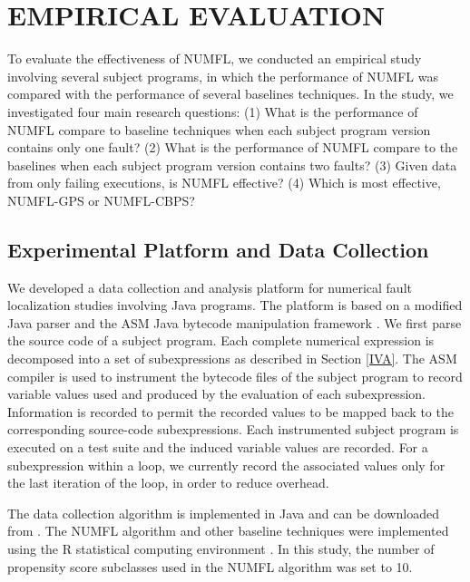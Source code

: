 \section{EMPIRICAL EVALUATION}\label{numfl_evaluation}
To evaluate the effectiveness of NUMFL, we conducted an empirical study involving several subject programs, in which the performance of NUMFL was compared with the performance of several baselines techniques. In the study, we investigated four main research questions:  (1) What is the performance of NUMFL compare to baseline techniques when each subject program version contains only one fault?  (2) What is the performance of NUMFL compare to the baselines when each subject program version contains two faults?   (3) Given data from only failing executions, is NUMFL effective?  (4) Which is most effective, NUMFL-GPS or NUMFL-CBPS?

\subsection{Experimental Platform and Data Collection}
We developed a data collection and analysis platform for numerical fault localization studies involving Java programs.  The platform is based on a modified Java parser \cite{Java} and the ASM Java bytecode manipulation framework \cite{ASM}.  We first parse the source code of a subject program.  Each complete numerical expression is decomposed into a set of subexpressions as described in Section \ref{IVA}.  The ASM compiler is used to instrument the bytecode files of the subject program to record variable values used and produced by the evaluation of each subexpression.  Information is recorded to permit the recorded values to be mapped back to the corresponding source-code subexpressions.  Each instrumented subject program is executed on a test suite and the induced variable values are recorded.  For a subexpression within a loop, we currently record the associated values only for the last iteration of the loop, in order to reduce overhead.

The data collection algorithm is implemented in Java and can be downloaded from \cite{NUMFL}.  The NUMFL algorithm and other baseline techniques were implemented using the R statistical computing environment \cite{R}. In this study, the number of propensity score subclasses used in the NUMFL algorithm was set to 10.

